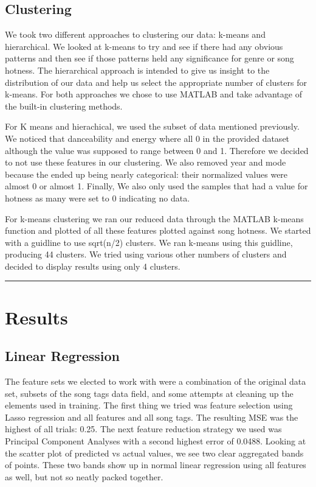 \documentclass[12pt]{article}
\newcommand{\horizontalLine}{
	\begin{center}
		\hrule width 1.0\textwidth
	\end{center}
}
\begin{document}
\subsection{Clustering}
\label{subsec:clustering}
We took two different approaches to clustering our data: k-means and hierarchical. We looked at k-means to try and see if there had any obvious patterns and then see if those patterns held any significance for genre or song hotness. The hierarchical approach is intended to give us insight to the distribution of our data and help us select the appropriate number of clusters for k-means. For both approaches we chose to use MATLAB and take advantage of the built-in clustering methods.

For K means and hierachical, we used the subset of data mentioned previously. We noticed that danceability and energy where all 0 in the provided dataset although the value was supposed to range between 0 and 1. Therefore we decided to not use these features in our clustering. We also removed year and mode because the ended up being nearly categorical: their normalized values were almost 0 or almost 1. Finally, We also only used the samples that had a value for hotness as many were set to 0 indicating no data. 

For k-means clustering we ran our reduced data through the MATLAB k-means function and plotted of all these features plotted against song hotness. We started with a guidline to use sqrt(n/2) clusters. We ran k-means using this guidline, producing 44 clusters. We tried using various other numbers of clusters and decided to display results using only 4 clusters.

\horizontalLine
\section{Results}
\label{sec:results}
\subsection{Linear Regression}
\label{subsec:linearRegressionResults}
The feature sets we elected to work with were a combination of the original data set, subsets of the song tags data field, and some attempts at cleaning up the elements used in training. The first thing we tried was feature selection using Lasso regression and all features and all song tags. The resulting MSE was the highest of all trials: 0.25. The next feature reduction strategy we used was Principal Component Analyses with a second highest error of 0.0488. Looking at the scatter plot of predicted vs actual values, we see two clear aggregated bands of points. These two bands show up in normal linear regression using all features as well, but not so neatly packed together.
\end{document}

